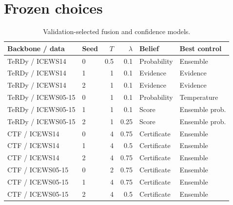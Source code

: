 \section{Frozen choices}\begin{longtable}{llrrll}\caption{Validation-selected fusion and confidence models.}\\\toprule Backbone / data & Seed & $T$ & $\lambda$ & Belief & Best control\\\midrule\endhead
TeRDy / ICEWS14 & 0 & 0.5 & 0.1 & Probability & Ensemble\\
TeRDy / ICEWS14 & 1 & 1 & 0.1 & Evidence & Evidence\\
TeRDy / ICEWS14 & 2 & 1 & 0.1 & Evidence & Evidence\\
TeRDy / ICEWS05-15 & 0 & 1 & 0.1 & Probability & Temperature\\
TeRDy / ICEWS05-15 & 1 & 1 & 0.1 & Score & Ensemble prob.\\
TeRDy / ICEWS05-15 & 2 & 1 & 0.25 & Score & Ensemble prob.\\
CTF / ICEWS14 & 0 & 4 & 0.75 & Certificate & Ensemble\\
CTF / ICEWS14 & 1 & 4 & 0.5 & Certificate & Ensemble\\
CTF / ICEWS14 & 2 & 4 & 0.75 & Certificate & Ensemble\\
CTF / ICEWS05-15 & 0 & 2 & 0.75 & Certificate & Ensemble\\
CTF / ICEWS05-15 & 1 & 4 & 0.75 & Certificate & Ensemble\\
CTF / ICEWS05-15 & 2 & 4 & 0.5 & Certificate & Ensemble\\
\bottomrule\end{longtable}
